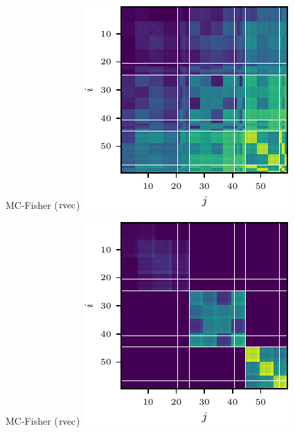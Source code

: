 \begin{figure}[t!]
\begin{minipage}[t]{0.485\linewidth}
  \end{minipage}
  \\
  \begin{minipage}[t]{0.485\linewidth}
    \centering
    MC-Fisher ($\operatorname{rvec}$)\vspace{1ex}
    \includegraphics[width=0.8\linewidth]{../kfs/plots/synthetic_rvec_mcfisher_100_full.pdf}
  \end{minipage}
  \hfill
  \begin{minipage}[t]{0.485\linewidth}
    \centering
    MC-Fisher ($\operatorname{rvec}$)\vspace{1ex}
    \includegraphics[width=0.8\linewidth]{../kfs/plots/synthetic_rvec_mcfisher_100_kfac.pdf}

\end{minipage}
\end{figure}
